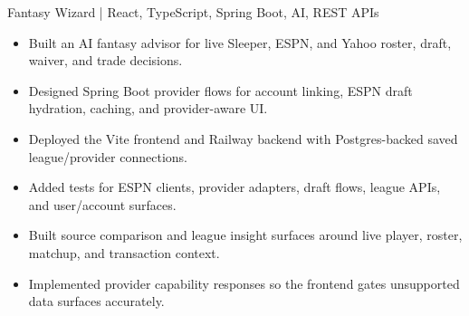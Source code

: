 \documentclass[letterpaper,10pt]{article}
\newcommand{\project}[2]{#1 | #2\vspace{-2pt}}
\begin{document}
\project{Fantasy Wizard}{React, TypeScript, Spring Boot, AI, REST APIs}
\begin{itemize}
  \item Built an AI fantasy advisor for live Sleeper, ESPN, and Yahoo roster, draft, waiver, and trade decisions.
  \item Designed Spring Boot provider flows for account linking, ESPN draft hydration, caching, and provider-aware UI.
  \item Deployed the Vite frontend and Railway backend with Postgres-backed saved league/provider connections.
  \item Added tests for ESPN clients, provider adapters, draft flows, league APIs, and user/account surfaces.
  \item Built source comparison and league insight surfaces around live player, roster, matchup, and transaction context.
  \item Implemented provider capability responses so the frontend gates unsupported data surfaces accurately.
\end{itemize}
\end{document}
